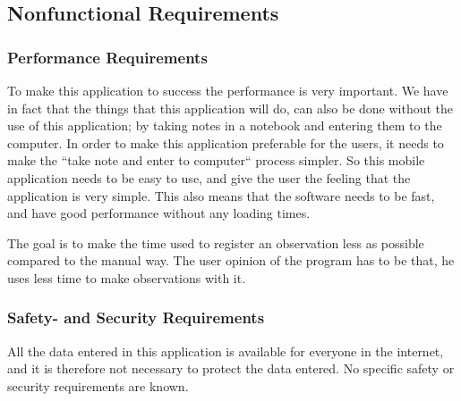 \subsection{Nonfunctional Requirements}
\subsubsection{Performance Requirements}
	To make this application to success the performance is very important. We have in fact that the things that this application will do, can also be done without the use of this application; by taking notes in a notebook and entering them to the computer. In order to make this application  preferable for the users, it needs to make the ``take note and enter to computer`` process simpler.  So this mobile application  needs to be easy to use, and give the user the feeling that the application is very simple. This also means that the software needs to be fast, and have good performance without any loading times.

The goal is to make the time used to register an observation less as possible compared to the manual way. The user opinion of the program has to be that, he uses less time to make observations with it. 

\subsubsection{ Safety- and Security Requirements}
	All the data entered in this application  is available for everyone in the internet, and it is therefore not necessary to protect the data entered. No specific safety or security requirements are known.
